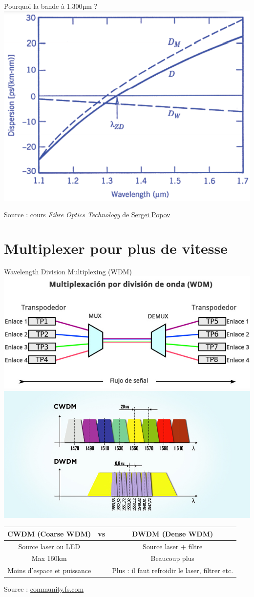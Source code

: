 \documentclass[aspectratio=149, 10pt, t]{beamer}
\begin{document}
\begin{frame}{Pourquoi la bande à 1.300µm ?}
    \centering
    \includegraphics[width=0.65\linewidth]{images/zero_dispersion_at_1300nm}

    {\footnotesize Source : cours \textit{Fibre Optics Technology} de \href{https://www.imperial.ac.uk/people/s.popov}{Sergei Popov}}
\end{frame}


\section{Multiplexer pour plus de vitesse}

\begin{frame}{Wavelength Division Multiplexing (WDM)}
    \centering
    \includegraphics[width=0.48\linewidth]{images/multiplexacion-por-division}
    \includegraphics[width=0.48\linewidth]{images/cwdm-dwdm}

    \vspace{0.75cm}

    \begin{tabular}{ccc}
        \hline
        CWDM (Coarse WDM) & vs & DWDM (Dense WDM)\\
        \hline
        Source laser ou LED & & Source laser + filtre \\
        Max 160km & & Beaucoup plus \\
        Moins d'espace et puissance & & Plus : il faut refroidir le laser, filtrer etc. \\
    \hline
    \end{tabular}

    {\footnotesize Source : \href{https://community.fs.com/fr/blog/wdm-technology-basis-cwdm-vs-dwdm.html}{community.fs.com}}
    
\end{frame}
\end{document}
